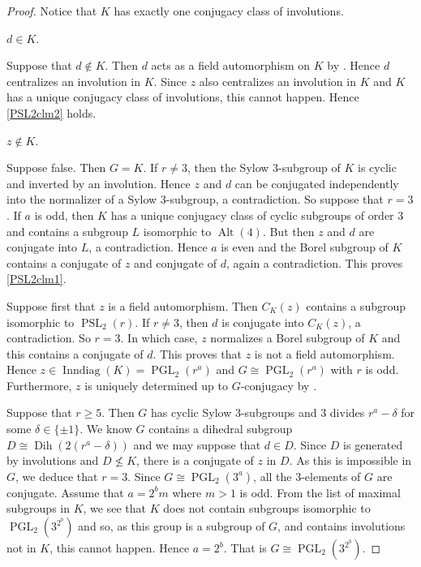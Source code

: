 \documentclass[12pt,a4paper]{amsart}
\DeclareMathOperator{\Inndiag}{Inndiag}
\DeclareMathOperator{\PGL}{PGL}
\DeclareMathOperator{\PSL}{PSL}
\DeclareMathOperator{\Alt}{Alt}
\DeclareMathOperator{\Dih}{Dih}
\begin{document}
\begin{proof}    Notice that $K$ has   exactly one conjugacy class of involutions.


\begin{claim}\label{PSL2clm2}  $d \in  K$.
\end{claim}

Suppose that $d \not \in K$. Then $d$ acts as a field automorphism on $K$ by \cite[Proposition 4.9.1]{GLS3}. Hence $d$ centralizes an involution in $K$. Since $z$ also centralizes an involution in $K$ and $K$ has a unique conjugacy class of involutions, this cannot happen. Hence \ref{PSL2clm2} holds.



\begin{claim} \label{PSL2clm1} $z\not \in K$.
\end{claim}

Suppose false.  Then $G=K$. If $r\ne 3$, then the Sylow $3$-subgroup of $K$ is cyclic and inverted by an involution. Hence $ z$ and $d$ can be conjugated independently into the normalizer of a Sylow $3$-subgroup, a contradiction. So suppose that $r=3$.  If $a$ is odd, then $K$ has a   unique conjugacy class of cyclic subgroups of order $3$ and contains a subgroup $L$ isomorphic to $\Alt(4)$.  But then $z$ and $d$ are conjugate into $L$, a contradiction. Hence $a$ is even and the Borel subgroup of $K$ contains a conjugate of $z$ and conjugate  of $d$, again a contradiction. This proves \ref{PSL2clm1}.

\medskip


Suppose first that $z$ is a field automorphism. Then $C_K(z) $ contains a subgroup isomorphic to $\PSL_2(r)$. If $r \ne 3$, then $d$ is conjugate into $C_K(z)$, a contradiction. So $r=3$. In which case, $z$ normalizes a Borel subgroup of $K$ and this contains a conjugate of $d$. This proves that $z$ is not a field automorphism. Hence $z\in \Inndiag(K)=\PGL_2(r^a)$ and $G \cong \PGL_2(r^a)$ with $r$ is odd. Furthermore, $z$ is uniquely determined up to $G$-conjugacy by \cite[Table 4.5.1]{GLS3}.

Suppose that $r \ge 5$.  Then $G$ has cyclic Sylow $3$-subgroups and $3$ divides $r^a -\delta $ for some $\delta\in\{\pm 1\}$. We know $G$ contains a dihedral subgroup $D\cong \Dih(2(r^a-\delta))$ and we may suppose that $d \in D$. Since $D$ is generated by involutions and $D \not \le K$, there is a conjugate of $z$ in  $D$. As this is impossible in $G$, we deduce that $r=3$. Since $G \cong \PGL_2(3^a)$, all the $3$-elements of $G$ are conjugate. Assume that $a=2^bm$ where $m>1$ is odd.  From the list of maximal subgroups in $K$, we see that $K$ does not contain   subgroups isomorphic to $\PGL_2(3^{2^b})$ and so, as this   group is a subgroup of $G$, and contains involutions not in $K$, this   cannot happen. Hence $a= 2^b$. That is $G \cong \PGL_2(3^{2^b})$.


\end{proof}
\end{document}
